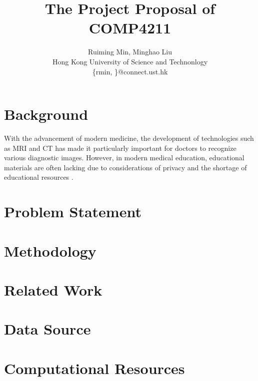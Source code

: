 \documentclass{article}
\title{The Project Proposal of COMP4211}
\author{
    Ruiming Min, Minghao Liu\\
    Hong Kong University of Science and Technonlogy \\
    {\{rmin, \}@connect.ust.hk}
}
\begin{document}
\maketitle


\section{Background}

With the advancement of modern medicine, the development of technologies such as MRI and CT has made it particularly important for doctors to recognize various diagnostic images. 
However, in modern medical education, educational materials are often lacking due to considerations of privacy and the shortage of educational resources \cite{vaggi_2003}.
\section{Problem Statement}

\section{Methodology}

\section{Related Work}

\section{Data Source}

\section{Computational Resources}

\printbibliography
\end{document}
